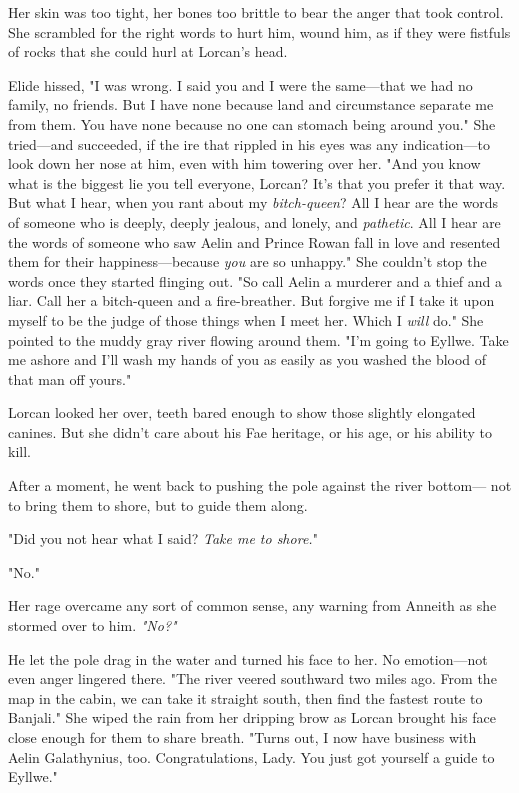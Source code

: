 Her skin was too tight, her bones too brittle to bear the anger that took control.
She scrambled for the right words to hurt him, wound him, as if they were fistfuls of rocks that she could hurl at Lorcan's head.

Elide hissed, "I was wrong.
I said you and I were the same---that we had no family, no friends.
But I have none because land and circumstance separate me from them.
You have none because no one can stomach being around you."
She tried---and succeeded, if the ire that rippled in his eyes was any indication---to look down her nose at him, even with him towering over her.
"And you know what is the biggest lie you tell everyone, Lorcan?
It's that you prefer it that way.
But what I hear, when you rant about my \emph{bitch-queen}?
All I hear are the words of someone who is deeply, deeply jealous, and lonely, and \emph{pathetic}.
All I hear are the words of someone who saw Aelin and Prince Rowan fall in love and resented them for their happiness---because \emph{you} are so unhappy."
She couldn't stop the words once they started flinging out.
"So call Aelin a murderer and a thief and a liar.
Call her a bitch-queen and a fire-breather.
But forgive me if I take it upon myself to be the judge of those things when I meet her.
Which I \emph{will}
do."
She pointed to the muddy gray river flowing around them.
"I'm going to Eyllwe.
Take me ashore and I'll wash my hands of you as easily as you washed the blood of that man off yours."

Lorcan looked her over, teeth bared enough to show those slightly elongated canines.
But she didn't care about his Fae heritage, or his age, or his ability to kill.

After a moment, he went back to pushing the pole against the river bottom--- not to bring them to shore, but to guide them along.

"Did you not hear what I said?
\emph{Take me to shore.}"

"No."

Her rage overcame any sort of common sense, any warning from Anneith as she stormed over to him.
\emph{"No?"}

He let the pole drag in the water and turned his face to her.
No emotion---not even anger lingered there.
"The river veered southward two miles ago.
From the map in the cabin, we can take it straight south, then find the fastest route to Banjali."
She wiped the rain from her dripping brow as Lorcan brought his face close enough for them to share breath.
"Turns out, I now have business with Aelin Galathynius, too.
Congratulations, Lady.
You just got yourself a guide to Eyllwe."

